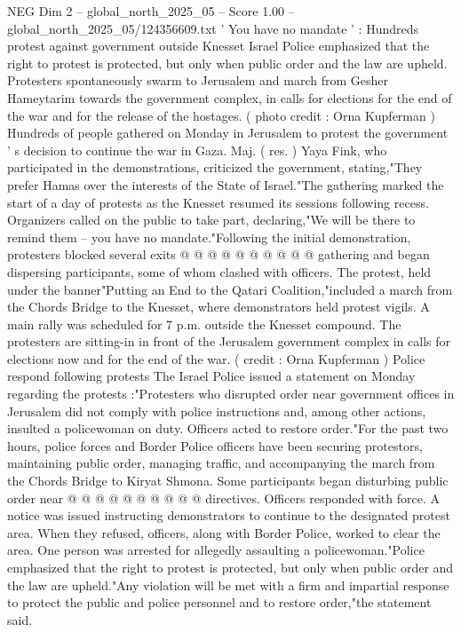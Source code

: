 \begin{textsample}{NEG Dim 2 – global\_north\_2025\_05 – Score 1.00 – global\_north\_2025\_05/124356609.txt}  \label{ex:f2_neg_231}
' You have no mandate ' : Hundreds protest against government outside Knesset Israel Police emphasized that the right to protest is protected, but only when public order and the law are upheld.
Protesters spontaneously swarm to Jerusalem and march from Gesher Hameytarim towards the government complex, in calls for elections for the end of the war and for the release of the hostages. ( photo credit : Orna Kupferman ) Hundreds of people gathered on Monday in Jerusalem to protest the government ' s decision to continue the war in Gaza.
Maj. ( res. ) Yaya Fink, who participated in the demonstrations, criticized the government, stating,"They prefer Hamas over the interests of the State of Israel."The gathering marked the start of a day of protests as the Knesset resumed its sessions following recess.
Organizers called on the public to take part, declaring,"We will be there to remind them -- you have no mandate."Following the initial demonstration, protesters blocked several exits @ @ @ @ @ @ @ @ @ @ gathering and began dispersing participants, some of whom clashed with officers.
The protest, held under the banner"Putting an End to the Qatari Coalition,"included a march from the Chords Bridge to the Knesset, where demonstrators held protest vigils.
A main rally was scheduled for 7 p.m. outside the Knesset compound.
The protesters are sitting-in in front of the Jerusalem government complex in calls for elections now and for the end of the war. ( credit : Orna Kupferman ) Police respond following protests The Israel Police issued a statement on Monday regarding the protests :"Protesters who disrupted order near government offices in Jerusalem did not comply with police instructions and, among other actions, insulted a policewoman on duty.
Officers acted to restore order."For the past two hours, police forces and Border Police officers have been securing protestors, maintaining public order, managing traffic, and accompanying the march from the Chords Bridge to Kiryat Shmona.
Some participants began disturbing public order near @ @ @ @ @ @ @ @ @ @ directives.
Officers responded with force.
A notice was issued instructing demonstrators to continue to the designated protest area.
When they refused, officers, along with Border Police, worked to clear the area.
One person was arrested for allegedly assaulting a policewoman."Police emphasized that the right to protest is protected, but only when public order and the law are upheld."Any violation will be met with a firm and impartial response to protect the public and police personnel and to restore order,"the statement said.

\end{textsample}
